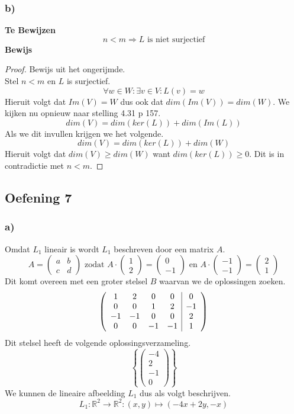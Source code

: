 \documentclass[lineaire_algebra_oplossingen.tex]{subfiles}
\begin{document}
\subsubsection*{b)}
\textbf{Te Bewijzen}
\[
n < m \Rightarrow L \text{ is niet surjectief}
\]
\textbf{Bewijs}
\begin{proof}
Bewijs uit het ongerijmde.\\
Stel $n<m$ en $L$ is surjectief.
\[
\forall w\in W:\exists v\in V: L(v)=w
\]
Hieruit volgt dat $Im(V)=W$ dus ook dat $dim(Im(V))=dim(W)$.
We kijken nu opnieuw naar stelling 4.31 p 157.
\[
dim(V) = dim(ker(L)) + dim(Im(L))
\]
Als we dit invullen krijgen we het volgende.
\[
dim(V) = dim(ker(L)) + dim(W)
\]
Hieruit volgt dat $dim(V) \ge dim(W)$ want $dim(ker(L)) \ge 0$. Dit is in contradictie met $n<m$.
\end{proof}

\subsection{Oefening 7}
\subsubsection*{a)}
Omdat $L_1$ lineair is wordt $L_1$ beschreven door een matrix $A$.
\[
A = 
\begin{pmatrix}
a & b \\
c & d
\end{pmatrix}
\text{ zodat }
A
\cdot
\begin{pmatrix}1\\2\end{pmatrix}
=\begin{pmatrix}0\\-1\end{pmatrix}
\text{ en }
A
\cdot
\begin{pmatrix}-1\\-1\end{pmatrix}
=\begin{pmatrix}2\\1\end{pmatrix}
\]
Dit komt overeen met een groter stelsel $B$ waarvan we de oplossingen zoeken.
\[
\left(
\begin{array}{c c c c | c}
1 & 2 & 0 & 0 & 0\\
0 & 0 & 1 & 2 & -1\\
-1 & -1 & 0 & 0 & 2\\
0 & 0 & -1 & -1 & 1\\
\end{array}
\right)
\]
Dit stelsel heeft de volgende oplossingsverzameling.
\[
\left\lbrace
\begin{pmatrix}
-4\\2\\-1\\0
\end{pmatrix}
\right\rbrace
\]
We kunnen de lineaire afbeelding $L_1$ dus als volgt beschrijven.
\[
L_1:\mathbb{R}^2\rightarrow\mathbb{R}^2: (x,y)\mapsto (-4x+2y,-x)
\]
\end{document}
